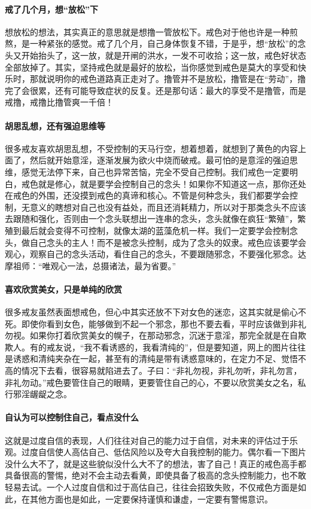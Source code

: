 \paragraph{戒了几个月，想“放松”下} 想放松的想法，其实真正的意思就是想撸一管放松下。戒色对于他也许是一种煎熬，是一种紧张的感觉。戒了几个月，自己身体恢复不错，于是乎，想“放松”的念头又开始抬头了，这一放，就是开闸的洪水，一发不可收拾；这一放，戒色好状态全部放掉了。其实，坚持戒色就是最好的放松，当你感觉到戒色是莫大的享受和快乐时，那就说明你的戒色道路真正走对了。撸管并不是放松，撸管是在“劳动”，撸完了会很累，还有可能导致症状的反复。还是那句话：最大的享受不是撸管，而是戒撸，戒撸比撸管爽一千倍！

\paragraph{胡思乱想，还有强迫思维等} 很多戒友喜欢胡思乱想，不受控制的天马行空，想着想着，就想到了黄色的内容上面了，然后就开始意淫，逐渐发展为欲火中烧而破戒。最可怕的是意淫的强迫思维，感觉无法停下来，自己也异常苦恼，完全不受自己控制。我们戒色一定要明白，戒色就是修心，就是要学会控制自己的念头！如果你不知道这一点，那你还处在戒色的外围，还没摸到戒色的真谛和核心。不管是何种念头，我们都要学会控制，无意义的瞎想对自己也没有益处，而且还消耗精力，所以对于那类念头不应该去跟随和强化，否则由一个念头联想出一连串的念头，念头就像在疯狂“繁殖”，繁殖到最后就会变得不可控制，就像太湖的蓝藻危机一样。我们一定要学会控制念头，做自己念头的主人！而不是被念头控制，成为了念头的奴隶。戒色应该要学会观心，观察自己的念头活动，看住自己的念头，不要跟随邪念，不要强化邪念。达摩祖师：“唯观心一法，总摄诸法，最为省要。”

\paragraph{喜欢欣赏美女，只是单纯的欣赏} 很多戒友虽然表面想戒色，但心中其实还放不下对女色的迷恋，这其实就是偷心不死。即使你看到女色，能够做到不起一个邪念，那也不要去看，平时应该做到非礼勿视。如果你打着欣赏美女的幌子，在那动邪念，沉迷于意淫，那完全就是在自欺欺人。有的戒友说，“我不看诱惑的，我看清纯的”，但是要知道，网上的图片往往是诱惑和清纯夹杂在一起，甚至有的清纯是带有诱惑意味的，在定力不足、觉悟不高的情况下去看，很容易就陷进去了。子曰：“非礼勿视，非礼勿听，非礼勿言，非礼勿动。”戒色要管住自己的眼睛，更要管住自己的心，不要以欣赏美女之名，私行邪淫龌龊之念。

\paragraph{自认为可以控制住自己，看点没什么} 这就是过度自信的表现，人们往往对自己的能力过于自信，对未来的评估过于乐观。过度自信使人高估自己、低估风险以及夸大自我控制的能力。偶尔看一下图片没什么大不了，就是这些貌似没什么大不了的想法，害了自己！真正的戒色高手都具备很高的警惕，绝对不会主动去看黄，即使具备了极高的念头控制能力，也不敢轻易去试。一个人过度自信和过于高估自己，往往会招致失败，不仅戒色方面是如此，在其他方面也是如此，一定要保持谨慎和谦虚，一定要有警惕意识。

